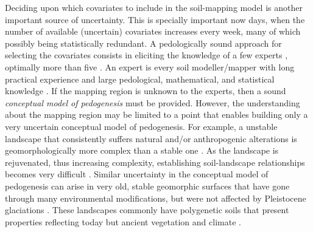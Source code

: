 Deciding upon which covariates to include in the soil-mapping model is another important source of 
uncertainty. This is specially important now days, when the number of available (uncertain) 
covariates increases every week, many of which possibly being statistically redundant. A 
pedologically sound approach for selecting the covariates consists in eliciting the knowledge of a 
few experts \citep{LarkEtAl2007b}, optimally more than five \citep{MeyerEtAl2001}. An expert is 
every soil modeller/mapper with long practical experience and large pedological, mathematical, and 
statistical knowledge \citep{MeyerEtAl2001}. If the mapping region is unknown to the experts, then
a sound \textit{conceptual model of pedogenesis} must be provided. However, the understanding
about the mapping region may be limited to a point that enables building only a very uncertain 
conceptual model of pedogenesis. For example, a unstable landscape that consistently suffers natural
and/or anthropogenic alterations is geomorphologically more complex than a stable one 
\citep{Schumm1979}. As the landscape is rejuvenated, thus increasing complexity, establishing 
soil-landscape relationships becomes very difficult \citep{StreckEtAl2008}. Similar uncertainty 
in the conceptual model of pedogenesis can arise in very old, stable geomorphic surfaces that have 
gone through many environmental modifications, but were not affected by Pleistocene glaciations 
\citep{MckenzieEtAl2006}. These landscapes commonly have polygenetic soils that present properties
reflecting today but ancient vegetation and climate \citep{PainEtAl1995, Ker1998a}.

